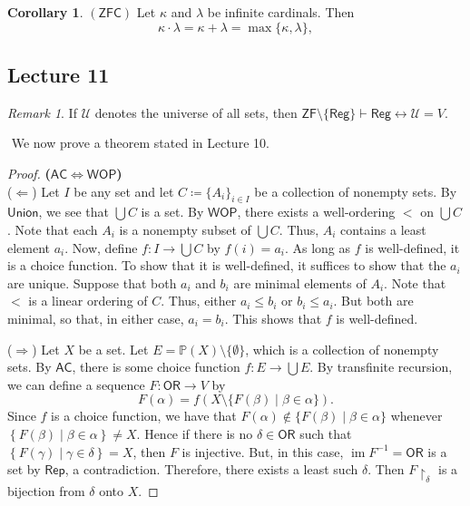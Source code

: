 \documentclass[10pt,letterpaper,cm]{nupset}
\theoremstyle{definition}
\theoremstyle{theorem}
\newtheorem{corollary}[definition]{Corollary}
\theoremstyle{remark}
\newtheorem{remark}[definition]{Remark}
\newcommand{\U}{\mathcal U}
\renewcommand{\P}{\mathbb P}
\newcommand{\1}{\mathbf{1}}
\newcommand{\0}{\vec 0}
\newcommand{\zf}{\mathsf{ZF}}
\newcommand{\zfc}{\mathsf{ZFC}}
\newcommand{\ac}{\mathsf{AC}}
\newcommand{\ord}{\mathsf{OR}}
\DeclareMathOperator{\im}{im}
\begin{document}
\begin{corollary}{$(\zfc)$}
Let $\kappa$ and $\lambda$ be infinite cardinals.
Then $$\kappa \cdot \lambda = \kappa + \lambda = \max\{\kappa, \lambda\},$$
\end{corollary}

\subsection{Lecture 11}

\begin{remark}
If $\U$ denotes the universe of all sets, then $\zf \setminus \{\mathsf{Reg}\} \vdash \mathsf{Reg} \leftrightarrow \U = V$.
\end{remark}$ $
We now prove a theorem stated in Lecture 10.

\begin{proof}{\textbf{($\ac \iff \mathsf{WOP}$)}}$ $\\ 
($\Longleftarrow$) Let $I$ be any set and let $C\coloneqq \{A_i\}_{i\in I}$ be a collection of nonempty sets. By  $\mathsf{Union}$, we see that $\bigcup C$ is a set. By $\mathsf{WOP}$, there exists a well-ordering $<$ on $\bigcup C$. Note that each $A_i$ is a nonempty subset of $\bigcup C$. Thus, $A_i$ contains a least element $a_i$. Now, define $f: I \rightarrow \bigcup C$ by $f(i)=a_i$. As long as $f$ is well-defined, it is a choice function. To show that it is well-defined, it suffices to show that the $a_i$ are unique. Suppose that both $a_i$ and $b_i$ are minimal elements of $A_i$. Note  that $<$ is a linear ordering of $C$. Thus, either $a_i \leq b_i$ or $b_i\leq a_i$. But both are minimal, so that, in either case, $a_i=b_i$. This shows that $f$ is well-defined.

\smallskip

($\Longrightarrow$) Let $X$ be a set. Let $E = \P(X) \setminus \{\emptyset\}$, which is a collection of nonempty sets. By $\ac$, there is some choice function $f : E \to \bigcup{E}$.  By transfinite recursion, we can define a sequence $F : \ord \to V$ by 
$$ F(\alpha) = f(X \setminus \{F(\beta) \mid \beta \in \alpha \})   .$$ Since $f$ is a choice function, we have that $F(\alpha) \notin \{F(\beta) \mid \beta \in \alpha\}$ whenever $\left\{F(\beta) \mid \beta \in \alpha\right\} \ne X$. Hence if there is no $\delta \in \ord$ such that $\left\{F(\gamma) \mid \gamma \in \delta\right\} =X$, then $F$ is injective. But, in this case, $\im{F^{-1}} = \ord$ is a set by $\mathsf{Rep}$, a contradiction. Therefore, there exists a least such $\delta$. Then $F\restriction_{\delta}$ is a bijection from $\delta$ onto $X$.
\end{proof}
\end{document}
